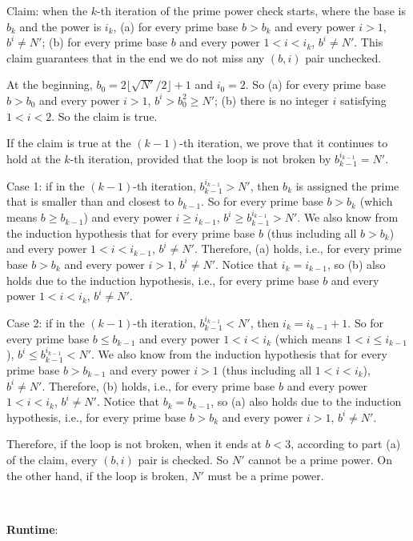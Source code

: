 \documentclass{article}
\begin{document}
Claim: when the $k$-th iteration of the prime power check starts, where the base is $b_k$ and the power is $i_k$, (a) for every prime base $b>b_k$ and every power $i>1$, $b^i\neq N'$; (b) for every prime base $b$ and every power $1<i<i_k$, $b^i\neq N'$. This claim guarantees that in the end we do not miss any $(b,i)$ pair unchecked.

At the beginning, $b_0=2\lfloor\sqrt{N'}/2\rfloor+1$ and $i_0=2$. So (a) for every prime base $b>b_0$ and every power $i>1$, $b^i>b_0^2\geqslant N'$; (b) there is no integer $i$ satisfying $1<i<2$. So the claim is true.

If the claim is true at the $(k-1)$-th iteration, we prove that it continues to hold at the $k$-th iteration, provided that the loop is not broken by $b_{k-1}^{i_{k-1}}=N'$.

Case 1: if in the $(k-1)$-th iteration, $b_{k-1}^{i_{k-1}}>N'$, then $b_k$ is assigned the prime that is smaller than and closest to $b_{k-1}$. So for every prime base $b>b_k$ (which means $b\geqslant b_{k-1}$) and every power $i\geqslant i_{k-1}$, $b^i\geqslant b_{k-1}^{i_{k-1}}>N'$. We also know from the induction hypothesis that for every prime base $b$ (thus including all $b>b_k$) and every power $1<i<i_{k-1}$, $b^i\neq N'$. Therefore, (a) holds, i.e., for every prime base $b>b_k$ and every power $i>1$, $b^i\neq N'$. Notice that $i_k=i_{k-1}$, so (b) also holds due to the induction hypothesis, i.e., for every prime base $b$ and every power $1<i<i_k$, $b^i\neq N'$.


Case 2: if in the $(k-1)$-th iteration, $b_{k-1}^{i_{k-1}}<N'$, then $i_k=i_{k-1}+1$. So for every prime base $b\leqslant b_{k-1}$ and every power $1<i<i_k$ (which means $1<i\leqslant i_{k-1}$), $b^i\leqslant b_{k-1}^{i_{k-1}}<N'$. We also know from the induction hypothesis that for every prime base $b>b_{k-1}$ and every power $i>1$ (thus including all $1<i<i_k$), $b^i\neq N'$. Therefore, (b) holds, i.e., for every prime base $b$ and every power $1<i<i_k$, $b^i\neq N'$. Notice that $b_k=b_{k-1}$, so (a) also holds due to the induction hypothesis, i.e., for every prime base $b>b_k$ and every power $i>1$, $b^i\neq N'$.

Therefore, if the loop is not broken, when it ends at $b<3$, according to part (a) of the claim, every $(b,i)$ pair is checked. So $N'$ cannot be a prime power. On the other hand, if the loop is broken, $N'$ must be a prime power.

~

\noindent\textbf{Runtime}:
\end{document}
